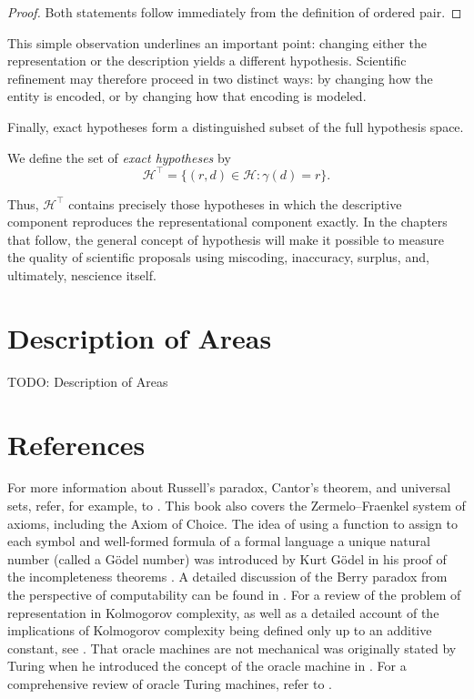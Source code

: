 \begin{proof}
Both statements follow immediately from the definition of ordered pair.
\end{proof}

This simple observation underlines an important point: changing either the representation or the description yields a different hypothesis. Scientific refinement may therefore proceed in two distinct ways: by changing how the entity is encoded, or by changing how that encoding is modeled.

Finally, exact hypotheses form a distinguished subset of the full hypothesis space.

\begin{definition}
\label{def:set_of_exact_hypotheses}
We define the set of \emph{exact hypotheses} by
\[
\mathcal{H}^{\top}
=
\{ (r,d) \in \mathcal{H} : \gamma(d)=r \}.
\]
\end{definition}

Thus, \(\mathcal{H}^{\top}\) contains precisely those hypotheses in which the descriptive component reproduces the representational component exactly. In the chapters that follow, the general concept of hypothesis will make it possible to measure the quality of scientific proposals using miscoding, inaccuracy, surplus, and, ultimately, nescience itself.

%
%

\section{Description of Areas}

{\color{red}TODO: Description of Areas}

%
%

\section{References}

For more information about Russell's paradox, Cantor's theorem, and universal sets, refer, for example, to \cite{jech2013set}. This book also covers the Zermelo–Fraenkel system of axioms, including the Axiom of Choice. The idea of using a function to assign to each symbol and well-formed formula of a formal language a unique natural number (called a Gödel number) was introduced by Kurt Gödel in his proof of the incompleteness theorems \cite{godel1931formal}. A detailed discussion of the Berry paradox from the perspective of computability can be found in \cite{chaitin1995berry}. For a review of the problem of representation in Kolmogorov complexity, as well as a detailed account of the implications of Kolmogorov complexity being defined only up to an additive constant, see \cite{li2013introduction}. That oracle machines are not mechanical was originally stated by Turing when he introduced the concept of the oracle machine in \cite{turing1939systems}. For a comprehensive review of oracle Turing machines, refer to \cite{robivc2015foundations}.
